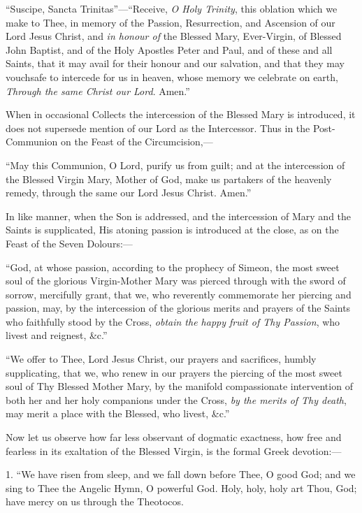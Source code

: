 ``Suscipe, Sancta Trinitas''—``Receive, \emph{O Holy
Trinity}, this oblation which we make to Thee, in memory of the
Passion, Resurrection, and Ascension of our Lord Jesus Christ, and \emph{in
honour of} the Blessed Mary, Ever-Virgin, of Blessed John Baptist,
and of the Holy Apostles Peter and Paul, and of these and all Saints,
that it may avail for their honour and our salvation, and that they may
vouchsafe to intercede for us in heaven, whose memory we celebrate on
earth, \emph{Through the same Christ our Lord}. Amen.''


When in occasional Collects the intercession of the Blessed Mary is
introduced, it does not supersede mention of our Lord as the
Intercessor. Thus in the Post-Communion on the Feast of the
Circumcision,—


``May this Communion, O Lord, purify us from guilt; and at the
intercession of the Blessed Virgin Mary, Mother of God, make us
partakers of the heavenly remedy, through the same our Lord Jesus
Christ. Amen.''


In like manner, when the Son is addressed, and the intercession of
Mary and the Saints is supplicated, His atoning passion is introduced at
the close, as on the Feast of the Seven Dolours:—


``God, at whose passion, according to the prophecy of Simeon, the
most sweet soul of the glorious Virgin-Mother Mary was pierced through
with the sword of sorrow, mercifully grant, that we, who reverently
commemorate her piercing and passion, may, by the intercession of
the glorious merits and prayers of the Saints who faithfully stood by
the Cross, \emph{obtain the happy fruit of Thy Passion}, who livest and
reignest, \&c.''


``We offer to Thee, Lord Jesus Christ, our prayers and
sacrifices, humbly supplicating, that we, who renew in our prayers the
piercing of the most sweet soul of Thy Blessed Mother Mary, by the
manifold compassionate intervention of both her and her holy companions
under the Cross, \emph{by the merits of Thy death}, may merit a place
with the Blessed, who livest, \&c.''


Now let us observe how far less observant of dogmatic exactness, how
free and fearless in its exaltation of the Blessed Virgin, is the formal
Greek devotion:—


1. ``We have risen from sleep, and we fall down before Thee, O
good God; and we sing to Thee the Angelic Hymn, O powerful God. Holy,
holy, holy art Thou, God; have mercy on us through the Theotocos.


